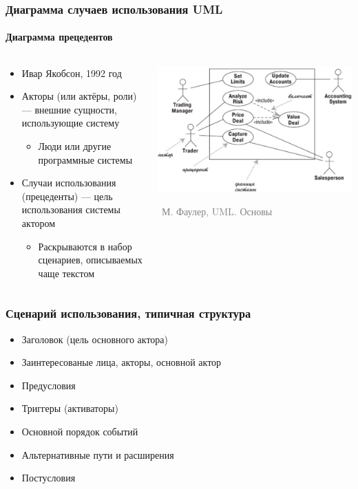 \documentclass[xetex,mathserif,serif]{beamer}
\newcommand{\attribution}[1] {
	\vspace{-5mm}\begin{flushright}\begin{scriptsize}\textcolor{gray}{\textcopyright\, #1}\end{scriptsize}\end{flushright}
}
\begin{document}
	\begin{frame}
		\frametitle{Диаграмма случаев использования UML}
		\framesubtitle{Диаграмма прецедентов}
		\begin{columns}
			\begin{column}{0.5\textwidth}
				\begin{itemize}
					\item Ивар Якобсон, 1992 год
					\item Акторы (или актёры, роли) --- внешние сущности, использующие систему
					\begin{itemize}
						\item Люди или другие программные системы
					\end{itemize}
					\item Случаи использования (прецеденты)  --- цель использования системы актором
					\begin{itemize}
						\item Раскрываются в набор сценариев, описываемых чаще текстом
					\end{itemize}
				\end{itemize}
			\end{column}
			\begin{column}{0.5\textwidth}
				\begin{center}
					\includegraphics[width=\textwidth]{useCaseDiagram.png}
					\attribution{М. Фаулер, UML. Основы}
				\end{center}
			\end{column}
		\end{columns}
	\end{frame}

	\begin{frame}
		\frametitle{Сценарий использования, типичная структура}
		\begin{itemize}
			\item Заголовок (цель основного актора)
			\item Заинтересованые лица, акторы, основной актор
			\item Предусловия
			\item Триггеры (активаторы)
			\item Основной порядок событий
			\item Альтернативные пути и расширения
			\item Постусловия
		\end{itemize}
	\end{frame}
\end{document}
